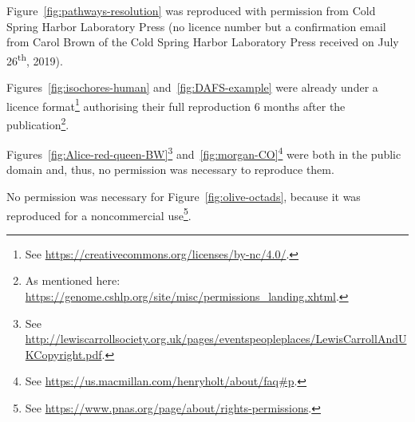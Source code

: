 Figure~\ref{fig:pathways-resolution} was reproduced with permission from Cold Spring Harbor Laboratory Press (no licence number but a confirmation email from Carol Brown of the Cold Spring Harbor Laboratory Press received on July 26\textsuperscript{th}, 2019).

Figures~\ref{fig:isochores-human} and~\ref{fig:DAFS-example} were already under a licence format\footnote{See \url{https://creativecommons.org/licenses/by-nc/4.0/}.} authorising their full reproduction 6 months after the publication\footnote{As mentioned here: \url{https://genome.cshlp.org/site/misc/permissions_landing.xhtml}.}.

Figures~\ref{fig:Alice-red-queen-BW}\footnote{See \url{http://lewiscarrollsociety.org.uk/pages/eventspeopleplaces/LewisCarrollAndUKCopyright.pdf}.} 
and~\ref{fig:morgan-CO}\footnote{See \url{https://us.macmillan.com/henryholt/about/faq\#p}.}
were both in the public domain and, thus, no permission was necessary to reproduce them.

No permission was necessary for Figure~\ref{fig:olive-octads}, because it was reproduced for a noncommercial use\footnote{See \url{https://www.pnas.org/page/about/rights-permissions}.}.

%
%
%
%
%
%
%
%




